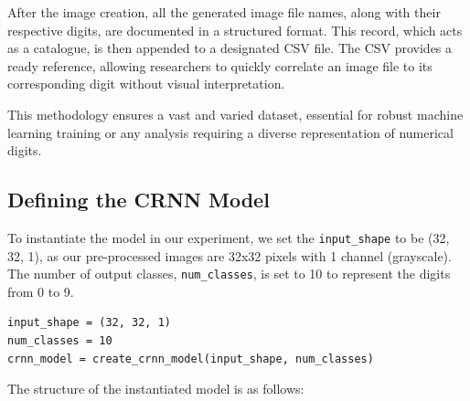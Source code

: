 After the image creation, all the generated image file names, along with their respective digits, are documented in a structured format. This record, which acts as a catalogue, is then appended to a designated CSV file. The CSV provides a ready reference, allowing researchers to quickly correlate an image file to its corresponding digit without visual interpretation.

This methodology ensures a vast and varied dataset, essential for robust machine learning training or any analysis requiring a diverse representation of numerical digits.


\subsection{Defining the CRNN Model}


To instantiate the model in our experiment, we set the \texttt{input\_shape} to be (32, 32, 1), as our pre-processed images are 32x32 pixels with 1 channel (grayscale). The number of output classes, \texttt{num\_classes}, is set to 10 to represent the digits from 0 to 9.

\begin{verbatim}
input_shape = (32, 32, 1)
num_classes = 10
crnn_model = create_crnn_model(input_shape, num_classes)
\end{verbatim}

The structure of the instantiated model is as follows:

